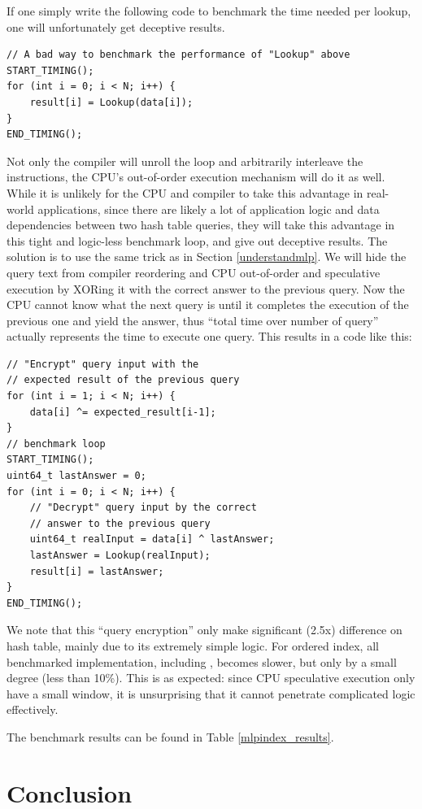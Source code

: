 \documentclass[11pt, usletter]{article}
\begin{document}
If one simply write the following code to benchmark the time needed per lookup, 
one will unfortunately get deceptive results.

\singlespacing\begin{codebox}
\begin{verbatim}
// A bad way to benchmark the performance of "Lookup" above
START_TIMING();
for (int i = 0; i < N; i++) { 
    result[i] = Lookup(data[i]);
}
END_TIMING();
\end{verbatim}
\end{codebox}\doublespacing

Not only the compiler will unroll the loop and arbitrarily interleave the instructions, 
the CPU's out-of-order execution mechanism will do it as well. 
While it is unlikely for the CPU and compiler to take this advantage in real-world applications, 
since there are likely a lot of application logic and data dependencies between two hash table queries, 
they will take this advantage in this tight and logic-less benchmark loop, and give out deceptive results. 
The solution is to use the same trick as in Section \ref{understandmlp}. 
We will hide the query text from compiler reordering and CPU out-of-order and speculative execution by 
XORing it with the correct answer to the previous query. 
Now the CPU cannot know what the next query is until it completes the execution of the previous one and yield the answer, 
thus ``total time over number of query'' actually represents the time to execute one query. 
This results in a code like this:

\singlespacing\begin{codebox}
\begin{verbatim}
// "Encrypt" query input with the 
// expected result of the previous query
for (int i = 1; i < N; i++) {
    data[i] ^= expected_result[i-1];
}
// benchmark loop
START_TIMING();
uint64_t lastAnswer = 0;
for (int i = 0; i < N; i++) { 
    // "Decrypt" query input by the correct 
    // answer to the previous query 
    uint64_t realInput = data[i] ^ lastAnswer;
    lastAnswer = Lookup(realInput);
    result[i] = lastAnswer;
}
END_TIMING();
\end{verbatim}
\end{codebox}\doublespacing

We note that this ``query encryption'' only make significant (2.5x) difference on hash table, mainly due to its extremely simple logic. 
For ordered index, all benchmarked implementation, including \MlpIndex, becomes slower, but only by a small degree (less than 10\%). 
This is as expected: since CPU speculative execution only have a small window, it is unsurprising that it 
cannot penetrate complicated logic effectively. 

The benchmark results can be found in Table \ref{mlpindex_results}.


\section{Conclusion} \label{conclusion}

{}

\end{document}
